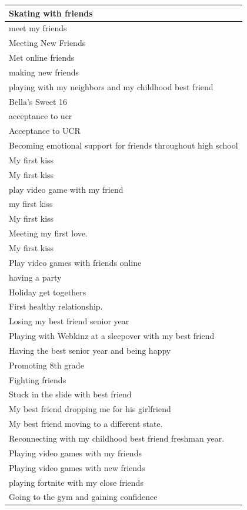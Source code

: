 \documentclass[
  .7em,
  letterpaper,
  DIV=11,
  numbers=noendperiod]{scrartcl}
\begin{document}
\begin{table}
\begin{tabular}{l}
\hline
Skating with friends\\
\hline
meet my friends\\
\hline
Meeting New Friends\\
\hline
Met online friends\\
\hline
making new friends\\
\hline
playing with my neighbors and my childhood best friend\\
\hline
Bella's Sweet 16\\
\hline
acceptance to ucr\\
\hline
Acceptance to UCR\\
\hline
Becoming emotional support for friends throughout high school\\
\hline
My first kiss\\
\hline
My first kiss\\
\hline
play video game with my friend\\
\hline
my first kiss\\
\hline
My first kiss\\
\hline
Meeting my first love.\\
\hline
My first kiss\\
\hline
Play video games with friends online\\
\hline
having a party\\
\hline
Holiday get togethers\\
\hline
First healthy relationship.\\
\hline
Losing my best friend senior year\\
\hline
Playing with Webkinz at a sleepover with my best friend\\
\hline
Having the best senior year and being happy\\
\hline
Promoting 8th grade\\
\hline
Fighting friends\\
\hline
Stuck in the slide with best friend\\
\hline
My best friend dropping me for his girlfriend\\
\hline
My best friend moving to a different state.\\
\hline
Reconnecting with my childhood best friend freshman year.\\
\hline
Playing video games with my friends\\
\hline
Playing video games with new friends\\
\hline
playing fortnite with my close friends\\
\hline
Going to the gym and gaining confidence\\

\end{tabular}
\end{table}
\end{document}

